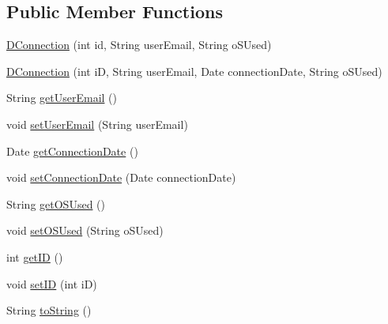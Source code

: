 \subsection*{Public Member Functions}
\begin{DoxyCompactItemize}
\item 
\mbox{\hyperlink{classes_1_1deusto_1_1bspq18_1_1e6_1_1_deusto_box_1_1_server_1_1jdo_1_1data_1_1_d_connection_ac2be5920bc868294fc20d93143a86b80}{D\+Connection}} (int id, String user\+Email, String o\+S\+Used)
\item 
\mbox{\hyperlink{classes_1_1deusto_1_1bspq18_1_1e6_1_1_deusto_box_1_1_server_1_1jdo_1_1data_1_1_d_connection_a532f2c9c7b7d7d9d78364d0ffb75687e}{D\+Connection}} (int iD, String user\+Email, Date connection\+Date, String o\+S\+Used)
\item 
String \mbox{\hyperlink{classes_1_1deusto_1_1bspq18_1_1e6_1_1_deusto_box_1_1_server_1_1jdo_1_1data_1_1_d_connection_aec8b4439b4beef469310fbee9ff771e7}{get\+User\+Email}} ()
\item 
void \mbox{\hyperlink{classes_1_1deusto_1_1bspq18_1_1e6_1_1_deusto_box_1_1_server_1_1jdo_1_1data_1_1_d_connection_af380601672fe7f0a3e463e70d0a45094}{set\+User\+Email}} (String user\+Email)
\item 
Date \mbox{\hyperlink{classes_1_1deusto_1_1bspq18_1_1e6_1_1_deusto_box_1_1_server_1_1jdo_1_1data_1_1_d_connection_a9a240ec788c24a974470aee60dd5f8d4}{get\+Connection\+Date}} ()
\item 
void \mbox{\hyperlink{classes_1_1deusto_1_1bspq18_1_1e6_1_1_deusto_box_1_1_server_1_1jdo_1_1data_1_1_d_connection_afb3fc4a4cac7a38fde03362ca65f2581}{set\+Connection\+Date}} (Date connection\+Date)
\item 
String \mbox{\hyperlink{classes_1_1deusto_1_1bspq18_1_1e6_1_1_deusto_box_1_1_server_1_1jdo_1_1data_1_1_d_connection_a406a6da4686898c28001ef1085866af9}{get\+O\+S\+Used}} ()
\item 
void \mbox{\hyperlink{classes_1_1deusto_1_1bspq18_1_1e6_1_1_deusto_box_1_1_server_1_1jdo_1_1data_1_1_d_connection_a76128761ececac2b4dd1641e0061f9c3}{set\+O\+S\+Used}} (String o\+S\+Used)
\item 
int \mbox{\hyperlink{classes_1_1deusto_1_1bspq18_1_1e6_1_1_deusto_box_1_1_server_1_1jdo_1_1data_1_1_d_connection_ab5d7052a20c60ad31d991faa5a9f6464}{get\+ID}} ()
\item 
void \mbox{\hyperlink{classes_1_1deusto_1_1bspq18_1_1e6_1_1_deusto_box_1_1_server_1_1jdo_1_1data_1_1_d_connection_a2aadc1971f1aa8b865542f0bfd2cb18e}{set\+ID}} (int iD)
\item 
String \mbox{\hyperlink{classes_1_1deusto_1_1bspq18_1_1e6_1_1_deusto_box_1_1_server_1_1jdo_1_1data_1_1_d_connection_a8729bc0599bf4238e9d105ec29e28d0d}{to\+String}} ()
\end{DoxyCompactItemize}


